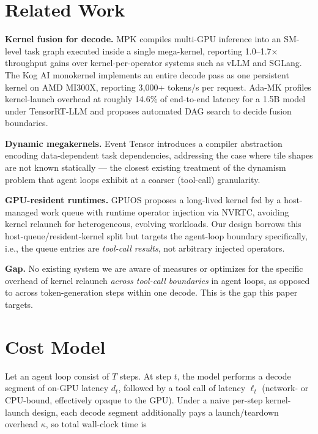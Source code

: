\documentclass{article}
\begin{document}
\section{Related Work}

\textbf{Kernel fusion for decode.} MPK \citep{mpk2025} compiles
multi-GPU inference into an SM-level task graph executed inside a
single mega-kernel, reporting 1.0--1.7$\times$ throughput gains over
kernel-per-operator systems such as vLLM and SGLang. The Kog AI
monokernel \citep{kog2026} implements an entire decode pass as one
persistent kernel on AMD MI300X, reporting 3{,}000+ tokens/s per
request. Ada-MK \citep{adamk2026} profiles kernel-launch overhead at
roughly 14.6\% of end-to-end latency for a 1.5B model under
TensorRT-LLM and proposes automated DAG search to decide fusion
boundaries.

\textbf{Dynamic megakernels.} Event Tensor \citep{eventtensor2026}
introduces a compiler abstraction encoding data-dependent task
dependencies, addressing the case where tile shapes are not known
statically --- the closest existing treatment of the dynamism problem
that agent loops exhibit at a coarser (tool-call) granularity.

\textbf{GPU-resident runtimes.} GPUOS \citep{gpuos2026} proposes a
long-lived kernel fed by a host-managed work queue with runtime
operator injection via NVRTC, avoiding kernel relaunch for
heterogeneous, evolving workloads. Our design borrows this
host-queue/resident-kernel split but targets the agent-loop boundary
specifically, i.e., the queue entries are \emph{tool-call results},
not arbitrary injected operators.

\textbf{Gap.} No existing system we are aware of measures or
optimizes for the specific overhead of kernel relaunch \emph{across
tool-call boundaries} in agent loops, as opposed to across
token-generation steps within one decode. This is the gap this paper
targets.

\section{Cost Model}
\label{sec:method}

Let an agent loop consist of $T$ steps. At step $t$, the model
performs a decode segment of on-GPU latency $d_t$, followed by a tool
call of latency $\ell_t$ (network- or CPU-bound, effectively opaque to
the GPU). Under a naive per-step kernel-launch design, each decode
segment additionally pays a launch/teardown overhead $\kappa$, so
total wall-clock time is
\end{document}
